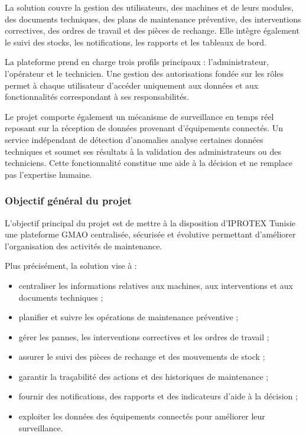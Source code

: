 La solution couvre la gestion des utilisateurs, des machines et de leurs modules, des documents techniques, des plans de maintenance préventive, des interventions correctives, des ordres de travail et des pièces de rechange. Elle intègre également le suivi des stocks, les notifications, les rapports et les tableaux de bord.

La plateforme prend en charge trois profils principaux : l’administrateur, l’opérateur et le technicien. Une gestion des autorisations fondée sur les rôles permet à chaque utilisateur d’accéder uniquement aux données et aux fonctionnalités correspondant à ses responsabilités.

Le projet comporte également un mécanisme de surveillance en temps réel reposant sur la réception de données provenant d’équipements connectés. Un service indépendant de détection d’anomalies analyse certaines données techniques et soumet ses résultats à la validation des administrateurs ou des techniciens. Cette fonctionnalité constitue une aide à la décision et ne remplace pas l’expertise humaine.

\subsubsection{Objectif général du projet}

L’objectif principal du projet est de mettre à la disposition d’IPROTEX Tunisie une plateforme GMAO centralisée, sécurisée et évolutive permettant d’améliorer l’organisation des activités de maintenance.

Plus précisément, la solution vise à :

\begin{itemize}
    \item centraliser les informations relatives aux machines, aux interventions et aux documents techniques ;
    \item planifier et suivre les opérations de maintenance préventive ;
    \item gérer les pannes, les interventions correctives et les ordres de travail ;
    \item assurer le suivi des pièces de rechange et des mouvements de stock ;
    \item garantir la traçabilité des actions et des historiques de maintenance ;
    \item fournir des notifications, des rapports et des indicateurs d’aide à la décision ;
    \item exploiter les données des équipements connectés pour améliorer leur surveillance.
\end{itemize}

